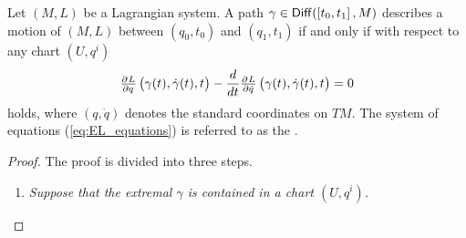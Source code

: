 \begin{theorem}
	\label{thm:EL_equations}
	Let $(M,L)$ be a Lagrangian system. A path $\gamma \in \mathsf{Diff}(\intcc[0]{t_0,t_1},M)$ describes a motion of $(M,L)$ between $(q_0,t_0)$ and $(q_1,t_1)$ if and only if with respect to any chart $(U,q^i)$
	\begin{equation}
		\label{eq:EL_equations}
		\pd{L}{q}\del[1]{\gamma(t),\dot{\gamma}(t),t} - \frac{d}{dt} \pd{L}{\dot{q}}\del[1]{\gamma(t),\dot{\gamma}(t),t} = 0
	\end{equation}
	\noindent holds, where $(q,\dot{q})$ denotes the standard coordinates on $TM$. The system of equations \textup{(}\ref{eq:EL_equations}\textup{)} is referred to as the .
\end{theorem}

\begin{proof}
	The proof is divided into three steps.
	\begin{enumerate}[label = \textit{Step} \arabic*:, wide = 0pt]
		\item \textit{Suppose that the extremal $\gamma$ is contained in a chart $(U,q^i)$.} 
	\end{enumerate}
\end{proof}
